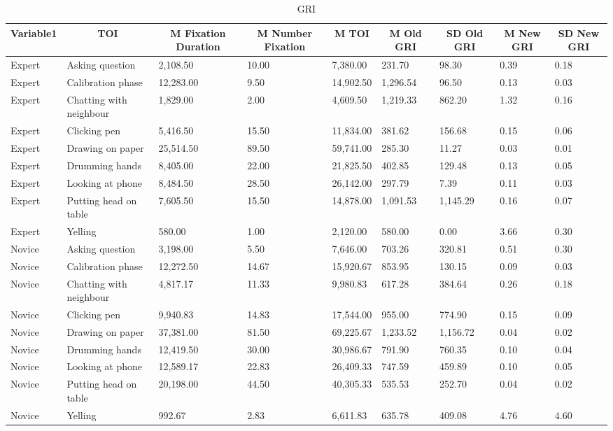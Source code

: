 \documentclass[
  english,
  man,floatsintext]{apa6}
\begin{document}
\begin{table}[h]

\begin{center}
\begin{threeparttable}

\caption{\label{tab:GRItable2}GRI}

\tiny{

\begin{tabular}{lllllllll}
\toprule
Variable1 & \multicolumn{1}{c}{TOI} & \multicolumn{1}{c}{M Fixation Duration} & \multicolumn{1}{c}{M Number Fixation} & \multicolumn{1}{c}{M TOI} & \multicolumn{1}{c}{M Old GRI} & \multicolumn{1}{c}{SD Old GRI} & \multicolumn{1}{c}{M New GRI} & \multicolumn{1}{c}{SD New GRI}\\
\midrule
Expert & Asking question & 2,108.50 & 10.00 & 7,380.00 & 231.70 & 98.30 & 0.39 & 0.18\\
Expert & Calibration phase & 12,283.00 & 9.50 & 14,902.50 & 1,296.54 & 96.50 & 0.13 & 0.03\\
Expert & Chatting with neighbour & 1,829.00 & 2.00 & 4,609.50 & 1,219.33 & 862.20 & 1.32 & 0.16\\
Expert & Clicking pen & 5,416.50 & 15.50 & 11,834.00 & 381.62 & 156.68 & 0.15 & 0.06\\
Expert & Drawing on paper & 25,514.50 & 89.50 & 59,741.00 & 285.30 & 11.27 & 0.03 & 0.01\\
Expert & Drumming hands & 8,405.00 & 22.00 & 21,825.50 & 402.85 & 129.48 & 0.13 & 0.05\\
Expert & Looking at phone & 8,484.50 & 28.50 & 26,142.00 & 297.79 & 7.39 & 0.11 & 0.03\\
Expert & Putting head on table & 7,605.50 & 15.50 & 14,878.00 & 1,091.53 & 1,145.29 & 0.16 & 0.07\\
Expert & Yelling & 580.00 & 1.00 & 2,120.00 & 580.00 & 0.00 & 3.66 & 0.30\\
Novice & Asking question & 3,198.00 & 5.50 & 7,646.00 & 703.26 & 320.81 & 0.51 & 0.30\\
Novice & Calibration phase & 12,272.50 & 14.67 & 15,920.67 & 853.95 & 130.15 & 0.09 & 0.03\\
Novice & Chatting with neighbour & 4,817.17 & 11.33 & 9,980.83 & 617.28 & 384.64 & 0.26 & 0.18\\
Novice & Clicking pen & 9,940.83 & 14.83 & 17,544.00 & 955.00 & 774.90 & 0.15 & 0.09\\
Novice & Drawing on paper & 37,381.00 & 81.50 & 69,225.67 & 1,233.52 & 1,156.72 & 0.04 & 0.02\\
Novice & Drumming hands & 12,419.50 & 30.00 & 30,986.67 & 791.90 & 760.35 & 0.10 & 0.04\\
Novice & Looking at phone & 12,589.17 & 22.83 & 26,409.33 & 747.59 & 459.89 & 0.10 & 0.05\\
Novice & Putting head on table & 20,198.00 & 44.50 & 40,305.33 & 535.53 & 252.70 & 0.04 & 0.02\\
Novice & Yelling & 992.67 & 2.83 & 6,611.83 & 635.78 & 409.08 & 4.76 & 4.60\\
\bottomrule
\end{tabular}

}
\end{threeparttable}
\end{center}
\end{table}
\end{document}
